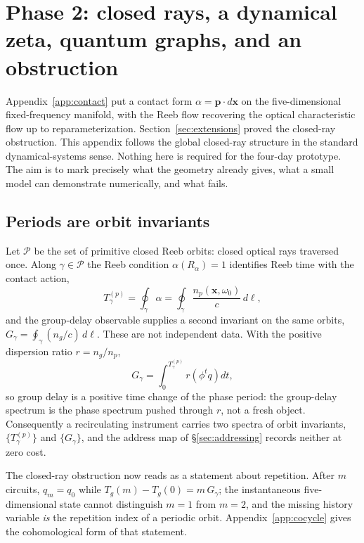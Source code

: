 \documentclass[11pt]{article}
\newcommand{\xv}{\mathbf{x}}
\newcommand{\pv}{\mathbf{p}}
\begin{document}
\section{Phase 2: closed rays, a dynamical zeta, quantum graphs, and an obstruction}\label{app:phase2}

Appendix~\ref{app:contact} put a contact form $\alpha = \pv\cdot d\xv$ on the
five-dimensional fixed-frequency manifold, with the Reeb flow recovering the optical
characteristic flow up to reparameterization. Section~\ref{sec:extensions} proved the
closed-ray obstruction. This appendix follows the global closed-ray structure in the
standard dynamical-systems sense. Nothing here is required for the four-day prototype.
The aim is to mark precisely what the geometry already gives, what a small model can
demonstrate numerically, and what fails.

\subsection{Periods are orbit invariants}

Let $\mathcal{P}$ be the set of primitive closed Reeb orbits: closed optical rays
traversed once. Along $\gamma\in\mathcal{P}$ the Reeb condition $\alpha(R_\alpha)=1$
identifies Reeb time with the contact action,
\begin{equation}
T^{(p)}_\gamma = \oint_\gamma \alpha
= \oint_\gamma \frac{n_p(\xv,\omega_0)}{c}\,d\ell ,
\end{equation}
and the group-delay observable supplies a second invariant on the same orbits,
$G_\gamma = \oint_\gamma (n_g/c)\,d\ell$. These are not independent data. With the
positive dispersion ratio $r = n_g/n_p$,
\begin{equation}
G_\gamma = \int_0^{T^{(p)}_\gamma} r\!\left(\phi^t q\right) dt ,
\end{equation}
so group delay is a positive time change of the phase period: the group-delay spectrum
is the phase spectrum pushed through $r$, not a fresh object. Consequently a
recirculating instrument carries two spectra of orbit invariants, $\{T^{(p)}_\gamma\}$
and $\{G_\gamma\}$, and the address map of \S\ref{sec:addressing} records neither at
zero cost.

The closed-ray obstruction now reads as a statement about repetition. After $m$
circuits, $q_m=q_0$ while $T_g(m)-T_g(0)=m\,G_\gamma$; the instantaneous five-
dimensional state cannot distinguish $m=1$ from $m=2$, and the missing history variable
\emph{is} the repetition index of a periodic orbit. Appendix~\ref{app:cocycle} gives
the cohomological form of that statement.
\end{document}

